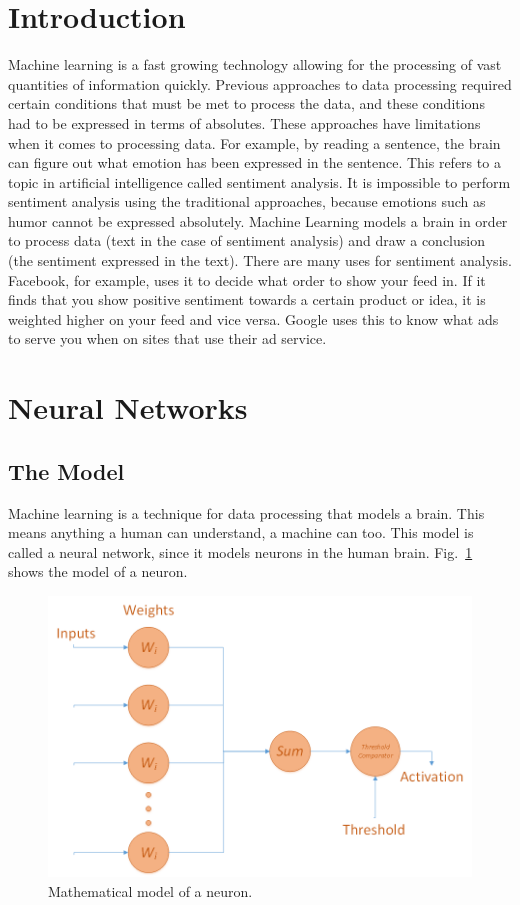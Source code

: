 \documentclass[12pt]{article}
\begin{document}
    \section{Introduction}
    Machine learning is a fast growing technology allowing for the processing of vast quantities of information quickly. Previous approaches to data processing required certain conditions that must be met to process the data, and these conditions had to be expressed in terms of absolutes. These approaches have limitations when it comes to processing data. For example, by reading a sentence, the brain can figure out what emotion has been expressed in the sentence. This refers to a topic in artificial intelligence called sentiment analysis. It is impossible to perform sentiment analysis using the traditional approaches, because emotions such as humor cannot be expressed absolutely. Machine Learning models a brain\autocite{MLVision} in order to process data (text in the case of sentiment analysis) and draw a conclusion (the sentiment expressed in the text)\autocite{GoldenAgeArchitecture}. There are many uses for sentiment analysis. Facebook, for example, uses it to decide what order to show your feed in. If it finds that you show positive sentiment towards a certain product or idea, it is weighted higher on your feed and vice versa. Google uses this to know what ads to serve you when on sites that use their ad service.

    \section{Neural Networks}
    \subsection{The Model}
    Machine learning is a technique for data processing that models a brain. This means anything a human can understand, a machine can too. This model is called a neural network, since it models neurons in the human brain. Fig.~\ref{fig:Neuron} shows the model of a neuron. 

    \begin{figure}
        \begin{center}
            \includegraphics[width=5in]{Neuron.png}
        \end{center}
        \caption{Mathematical model of a neuron.}
        \label{fig:Neuron}
    \end{figure}
\end{document}
